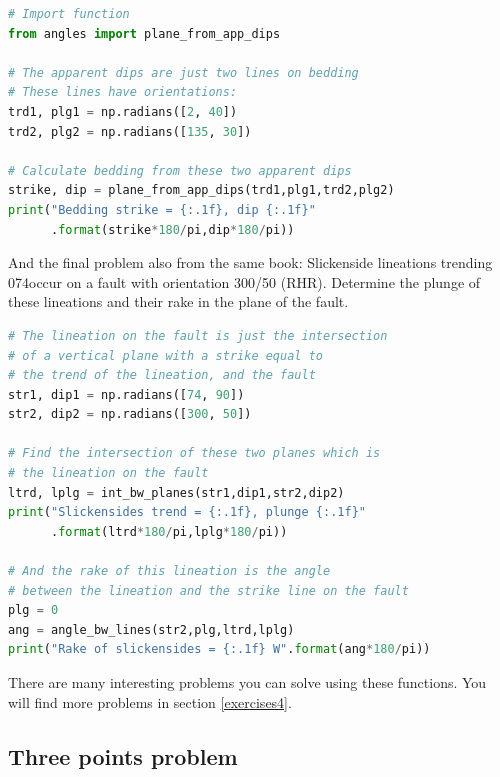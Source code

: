 \documentclass[a4paper , 12pt]{book}
\begin{document}
\begin{center}
\begin{lstlisting}[language=Python, frame=single]
# Import function
from angles import plane_from_app_dips

# The apparent dips are just two lines on bedding
# These lines have orientations:
trd1, plg1 = np.radians([2, 40])
trd2, plg2 = np.radians([135, 30])

# Calculate bedding from these two apparent dips
strike, dip = plane_from_app_dips(trd1,plg1,trd2,plg2)
print("Bedding strike = {:.1f}, dip {:.1f}"
      .format(strike*180/pi,dip*180/pi))
\end{lstlisting}
\end{center}

And the final problem also from the same book: Slickenside lineations trending 074\degree\space occur on a fault with orientation 300/50 (RHR). Determine the plunge of these lineations and their rake in the plane of the fault.

\begin{center}
\begin{lstlisting}[language=Python, frame=single]
# The lineation on the fault is just the intersection
# of a vertical plane with a strike equal to
# the trend of the lineation, and the fault
str1, dip1 = np.radians([74, 90])
str2, dip2 = np.radians([300, 50])

# Find the intersection of these two planes which is
# the lineation on the fault
ltrd, lplg = int_bw_planes(str1,dip1,str2,dip2)
print("Slickensides trend = {:.1f}, plunge {:.1f}"
      .format(ltrd*180/pi,lplg*180/pi))

# And the rake of this lineation is the angle
# between the lineation and the strike line on the fault
plg = 0
ang = angle_bw_lines(str2,plg,ltrd,lplg)
print("Rake of slickensides = {:.1f} W".format(ang*180/pi))
\end{lstlisting}
\end{center}

There are many interesting problems you can solve using these functions. You will find more problems in section \ref{exercises4}.

\subsection{Three points problem}\label{ThreePointProblem}
\end{document}
